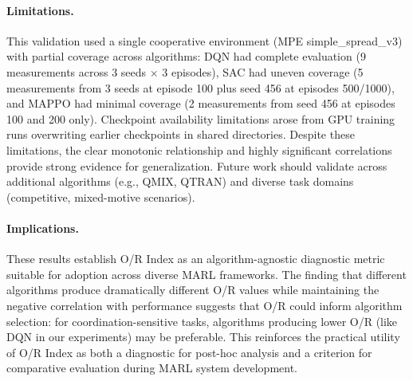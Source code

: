 \paragraph{Limitations.}
This validation used a single cooperative environment (MPE simple\_spread\_v3) with partial coverage across algorithms: DQN had complete evaluation (9 measurements across 3 seeds $\times$ 3 episodes), SAC had uneven coverage (5 measurements from 3 seeds at episode 100 plus seed 456 at episodes 500/1000), and MAPPO had minimal coverage (2 measurements from seed 456 at episodes 100 and 200 only). Checkpoint availability limitations arose from GPU training runs overwriting earlier checkpoints in shared directories. Despite these limitations, the clear monotonic relationship and highly significant correlations provide strong evidence for generalization. Future work should validate across additional algorithms (e.g., QMIX, QTRAN) and diverse task domains (competitive, mixed-motive scenarios).

\paragraph{Implications.}
These results establish O/R Index as an algorithm-agnostic diagnostic metric suitable for adoption across diverse MARL frameworks. The finding that different algorithms produce dramatically different O/R values while maintaining the negative correlation with performance suggests that O/R could inform algorithm selection: for coordination-sensitive tasks, algorithms producing lower O/R (like DQN in our experiments) may be preferable. This reinforces the practical utility of O/R Index as both a diagnostic for post-hoc analysis and a criterion for comparative evaluation during MARL system development.
